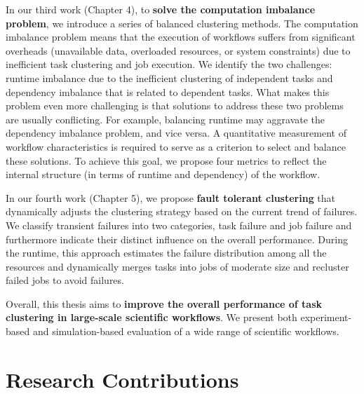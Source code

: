 In our third work \cite{Chen2013a,Chen2013b} (Chapter 4), to \textbf{solve the computation imbalance problem}, we introduce a series of balanced clustering methods. The computation imbalance problem means that the execution of workflows suffers from significant overheads (unavailable data, overloaded resources, or system constraints) due to inefficient task clustering and job execution. We identify the two challenges: runtime imbalance due to the inefficient clustering of independent tasks and dependency imbalance that is related to dependent tasks. What makes this problem even more challenging is that solutions to address these two problems are usually conflicting. For example, balancing runtime may aggravate the dependency imbalance problem, and vice versa. A quantitative measurement of workflow characteristics is required to serve as a criterion to select and balance these solutions. To achieve this goal, we propose four metrics to reflect the internal structure (in terms of runtime and dependency) of the workflow. 

In our fourth work \cite{Chen2012} (Chapter 5), we propose \textbf{fault tolerant clustering} that dynamically adjusts the clustering strategy based on the current trend of failures. We classify transient failures into two categories, task failure and job failure and furthermore indicate their distinct influence on the overall performance. During the runtime, this approach estimates the failure distribution among all the resources and dynamically merges tasks into jobs of moderate size and recluster failed jobs to avoid failures.


Overall, this thesis aims to \textbf{improve the overall performance of task clustering in large-scale scientific workflows}. We present both experiment-based and simulation-based evaluation of a wide range of scientific workflows. 


\section{Research Contributions}

